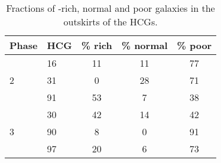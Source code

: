 \begin{table}
\centering
\caption{Fractions of \hi-rich, normal and poor galaxies in the outskirts of the HCGs.}\label{tab:hidef_stats}
\begin{tabular}{l l c c c} 
\hline 
\hline 
Phase & HCG & \% rich & \% normal & \% poor \\ 
\hline
\multirow{3}{*}{2} & 16 & 11 & 11 & 77\\ 
 & 31 & 0 & 28 & 71\\ 
 & 91 & 53 & 7 & 38\\ 
\hline\multirow{3}{*}{3} & 30 & 42 & 14 & 42\\ 
 & 90 & 8 & 0 & 91\\ 
 & 97 & 20 & 6 & 73\\ 
\hline
\end{tabular}
\end{table}